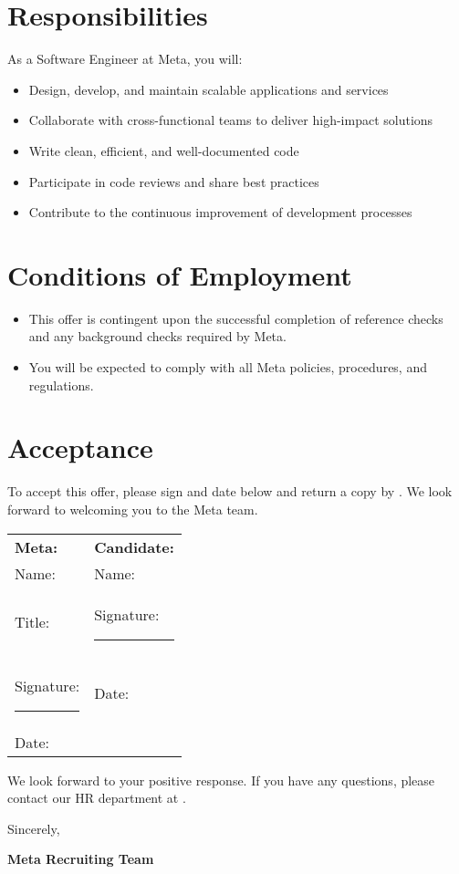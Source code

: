 \documentclass{article}
\begin{document}
\section*{Responsibilities}
As a Software Engineer at Meta, you will:
\begin{itemize}
    \item Design, develop, and maintain scalable applications and services
    \item Collaborate with cross-functional teams to deliver high-impact solutions
    \item Write clean, efficient, and well-documented code
    \item Participate in code reviews and share best practices
    \item Contribute to the continuous improvement of development processes
\end{itemize}

\section*{Conditions of Employment}
\begin{itemize}
    \item This offer is contingent upon the successful completion of reference checks and any background checks required by Meta.
    \item You will be expected to comply with all Meta policies, procedures, and regulations.
\end{itemize}

\section*{Acceptance}
To accept this offer, please sign and date below and return a copy by \underline{\hspace{5cm}}. We look forward to welcoming you to the Meta team.

\vspace{1cm}

\noindent
\begin{tabularx}{\textwidth}{@{}X@{}X@{}}
\textbf{Meta:} & \textbf{Candidate:}\\
Name: \underline{\hspace{6cm}} & Name: \underline{\hspace{6cm}}\\[0.5cm]
Title: \underline{\hspace{6cm}} & Signature: \rule{6cm}{0.4pt}\\[0.5cm]
Signature: \rule{6cm}{0.4pt} & Date: \underline{\hspace{6cm}}\\
Date: \underline{\hspace{6cm}} & \\
\end{tabularx}

\vspace{1cm}

We look forward to your positive response. If you have any questions, please contact our HR department at \underline{\hspace{6cm}}.

\noindent
Sincerely,

\noindent
\textbf{Meta Recruiting Team}
\end{document}
